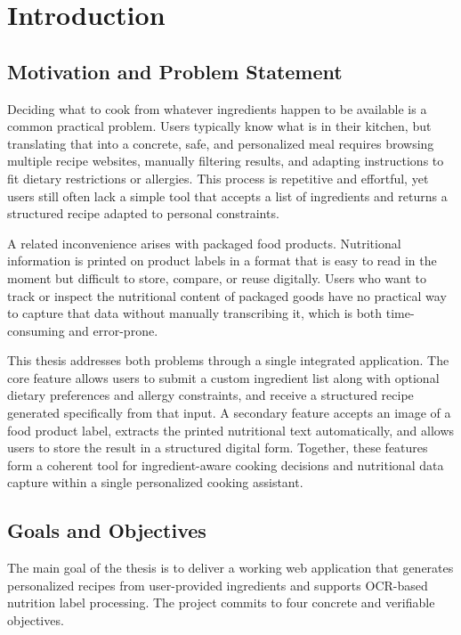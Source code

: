 \chapter{Introduction}
\label{ch:intro}

\section{Motivation and Problem Statement}

Deciding what to cook from whatever ingredients happen to be available is a
common practical problem. Users typically know what is in their kitchen, but
translating that into a concrete, safe, and personalized meal requires browsing
multiple recipe websites, manually filtering results, and adapting instructions
to fit dietary restrictions or allergies. This process is repetitive and
effortful, yet users still often lack a simple tool that accepts a list of
ingredients and returns a structured recipe adapted to personal constraints.

A related inconvenience arises with packaged food products. Nutritional
information is printed on product labels in a format that is easy to read in
the moment but difficult to store, compare, or reuse digitally. Users who
want to track or inspect the nutritional content of packaged goods have no
practical way to capture that data without manually transcribing it, which
is both time-consuming and error-prone.

This thesis addresses both problems through a single integrated application.
The core feature allows users to submit a custom ingredient list along with
optional dietary preferences and allergy constraints, and receive a structured
recipe generated specifically from that input. A secondary feature accepts
an image of a food product label, extracts the printed nutritional text
automatically, and allows users to store the result in a structured digital form. Together,
these features form a coherent tool for ingredient-aware cooking decisions
and nutritional data capture within a single personalized cooking
assistant. 

\section{Goals and Objectives}

The main goal of the thesis is to deliver a working web application that
generates personalized recipes from user-provided ingredients and supports
OCR-based nutrition label processing. The project commits to four concrete
and verifiable objectives.

